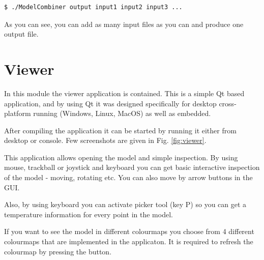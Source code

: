\documentclass[11pt]{article} %
\begin{document}
\begin{verbatim}
$ ./ModelCombiner output input1 input2 input3 ...
\end{verbatim}

As you can see, you can add as many input files as you can and produce one output file.

\section{Viewer}

In this module the viewer application is contained. This is a simple Qt based application, and by using Qt it was designed specifically for desktop cross-platform running (Windows, Linux, MacOS) as well as embedded.

After compiling the application it can be started by running it either from desktop or console. Few screenshots are given in Fig. \ref{fig:viewer}.

This application allows opening the model and simple inspection. By using mouse, trackball or joystick and keyboard you can get basic interactive inspection of the model - moving, rotating etc. You can also move by arrow buttons in the GUI.

Also, by using keyboard you can activate picker tool (key P) so you can get a temperature information for every point in the model.

If you want to see the model in different colourmaps you choose from 4 different colourmaps that are implemented in the applicaton. It is required to refresh the colourmap by pressing the button.
\end{document}
